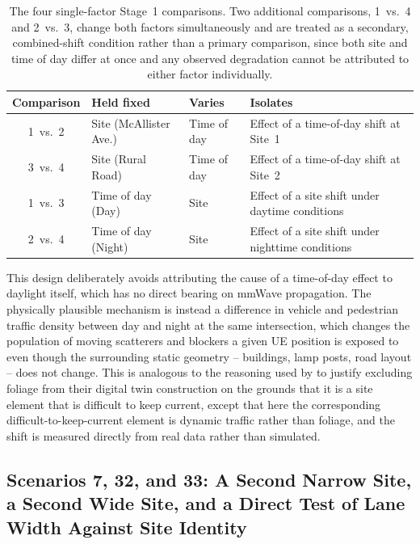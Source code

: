 \documentclass{iutbscthesis}
\begin{document}
\begin{table}[H]
    \centering
    \begin{tabular}{c p{} p{} p{}}
        \toprule
        Comparison & Held fixed & Varies & Isolates \\
        \midrule
        1~vs.~2 & Site (McAllister Ave.) & Time of day & Effect of a time-of-day shift at Site~1 \\
        3~vs.~4 & Site (Rural Road) & Time of day & Effect of a time-of-day shift at Site~2 \\
        1~vs.~3 & Time of day (Day) & Site & Effect of a site shift under daytime conditions \\
        2~vs.~4 & Time of day (Night) & Site & Effect of a site shift under nighttime conditions \\
        \bottomrule
    \end{tabular}
    \caption{The four single-factor Stage~1 comparisons. Two additional comparisons, 1~vs.~4 and 2~vs.~3, change both factors simultaneously and are treated as a secondary, combined-shift condition rather than a primary comparison, since both site and time of day differ at once and any observed degradation cannot be attributed to either factor individually.}
    \label{tab:comparisons}
\end{table}

This design deliberately avoids attributing the cause of a time-of-day effect to daylight itself, which has no direct bearing on mmWave propagation. The physically plausible mechanism is instead a difference in vehicle and pedestrian traffic density between day and night at the same intersection, which changes the population of moving scatterers and blockers a given UE position is exposed to even though the surrounding static geometry -- buildings, lamp posts, road layout -- does not change. This is analogous to the reasoning used by \textcite{jiang2024digitaltwincsi} to justify excluding foliage from their digital twin construction on the grounds that it is a site element that is difficult to keep current, except that here the corresponding difficult-to-keep-current element is dynamic traffic rather than foliage, and the shift is measured directly from real data rather than simulated.

\subsection{Scenarios 7, 32, and 33: A Second Narrow Site, a Second Wide Site, and a Direct Test of Lane Width Against Site Identity}
\label{sec:extendedscenarios}
\end{document}
